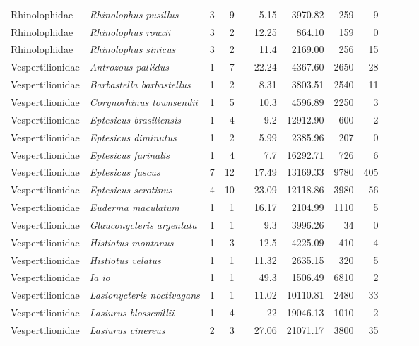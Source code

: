 \begin{landscape}
\begin{longtable}{@{}llrrrrrrrrrl@{}}
  Rhinolophidae & \emph{Rhinolophus pusillus} & 3 & 9 &  & 5.15 & 3970.82 & 259 & 9 &  &  &  \\ 
  Rhinolophidae & \emph{Rhinolophus rouxii} & 3 & 2 &  & 12.25 & 864.10 & 159 & 0 &  &  &  \\ 
  Rhinolophidae & \emph{Rhinolophus sinicus} & 3 & 2 &  & 11.4 & 2169.00 & 256 & 15 &  &  &  \\ 
  Vespertilionidae & \emph{Antrozous pallidus} & 1 & 7 &  & 22.24 & 4367.60 & 2650 & 28 &  &  &  \\ 
  Vespertilionidae & \emph{Barbastella barbastellus} & 1 & 2 &  & 8.31 & 3803.51 & 2540 & 11 &  &  &  \\ 
  Vespertilionidae & \emph{Corynorhinus townsendii} & 1 & 5 &  & 10.3 & 4596.89 & 2250 & 3 &  &  &  \\ 
  Vespertilionidae & \emph{Eptesicus brasiliensis} & 1 & 4 &  & 9.2 & 12912.90 & 600 & 2 &  &  &  \\ 
  Vespertilionidae & \emph{Eptesicus diminutus} & 1 & 2 &  & 5.99 & 2385.96 & 207 & 0 &  &  &  \\ 
  Vespertilionidae & \emph{Eptesicus furinalis} & 1 & 4 &  & 7.7 & 16292.71 & 726 & 6 &  &  &  \\ 
  Vespertilionidae & \emph{Eptesicus fuscus} & 7 & 12 &  & 17.49 & 13169.33 & 9780 & 405 &  &  &  \\ 
  Vespertilionidae & \emph{Eptesicus serotinus} & 4 & 10 &  & 23.09 & 12118.86 & 3980 & 56 &  &  &  \\ 
  Vespertilionidae & \emph{Euderma maculatum} & 1 & 1 &  & 16.17 & 2104.99 & 1110 & 5 &  &  &  \\ 
  Vespertilionidae & \emph{Glauconycteris argentata} & 1 & 1 &  & 9.3 & 3996.26 & 34 & 0 &  &  &  \\ 
  Vespertilionidae & \emph{Histiotus montanus} & 1 & 3 &  & 12.5 & 4225.09 & 410 & 4 &  &  &  \\ 
  Vespertilionidae & \emph{Histiotus velatus} & 1 & 1 &  & 11.32 & 2635.15 & 320 & 5 &  &  &  \\ 
  Vespertilionidae & \emph{Ia io} & 1 & 1 &  & 49.3 & 1506.49 & 6810 & 2 &  &  &  \\ 
  Vespertilionidae & \emph{Lasionycteris noctivagans} & 1 & 1 &  & 11.02 & 10110.81 & 2480 & 33 &  &  &  \\ 
  Vespertilionidae & \emph{Lasiurus blossevillii} & 1 & 4 &  & 22 & 19046.13 & 1010 & 2 &  &  &  \\ 
  Vespertilionidae & \emph{Lasiurus cinereus} & 2 & 3 &  & 27.06 & 21071.17 & 3800 & 35 &  &  &  \\ 

\end{longtable}
\end{landscape}

